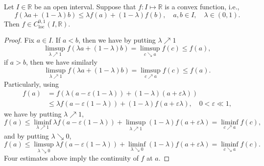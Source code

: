  
\begin{proposition}
	Let $I\in\mathbb{R}$ be an open interval. Suppose that $f: I\mapsto\mathbb{R}$ is a convex function,
	i.e.,
	\[
		f(\lambda a + (1-\lambda)b) \leq \lambda f(a) + (1-\lambda)f(b),\quad a,b\in I, \quad \lambda\in(0,1).
	\]
	Then $f\in C^{0,1}_{\mathrm{loc}}(I,\mathbb R)$.
\end{proposition}

\begin{proof}
	Fix $a\in I$.
	If $a<b$, then we have by putting $\lambda\nearrow1$
	\[
		\limsup_{\lambda\nearrow1}f(\lambda a + (1-\lambda)b) = \limsup_{c\searrow a}f(c)\leq f(a),
	\]
	if $a>b$, then we have similarly
	\[
		\limsup_{\lambda\nearrow1}f(\lambda a + (1-\lambda)b) = \limsup_{c\nearrow a}f(c)\leq f(a).
	\]
	Particularly, using
	\begin{align*}
		f(a) &= f(\lambda(a-\varepsilon(1-\lambda)) + (1-\lambda)(a+\varepsilon\lambda))\\
			&\leq \lambda f(a-\varepsilon(1-\lambda)) + (1-\lambda)f(a+\varepsilon\lambda),
			\quad 0<\varepsilon\ll 1,
	\end{align*}
	we have by putting $\lambda\nearrow1$,
	\[
		f(a)\leq \liminf_{\lambda\nearrow1}\lambda f(a-\varepsilon(1-\lambda)) 
			+ \limsup_{\lambda\nearrow1}(1-\lambda)f(a+\varepsilon\lambda)
			= \liminf_{c\nearrow a}f(c),
	\]
	and by putting $\lambda\searrow0$,
	\[
		f(a)\leq \limsup_{\lambda\searrow0}\lambda f(a-\varepsilon(1-\lambda)) 
			+ \liminf_{\lambda\searrow0}(1-\lambda)f(a+\varepsilon\lambda)
			= \liminf_{c\searrow a}f(c).
	\]	
	Four estimates above imply the continuity of $f$ at $a$.


\end{proof}
